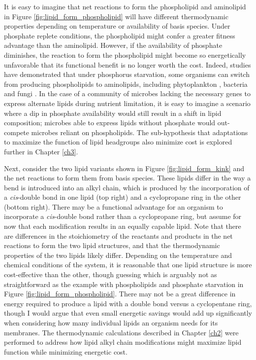It is easy to imagine that net reactions to form the phospholipid and aminolipid in Figure \ref{fig:lipid_form_phospholipid} will have different thermodynamic properties depending on temperature or availability of basis species. Under phosphate replete conditions, the phospholipid might confer a greater fitness advantage than the aminolipid. However, if the availability of phosphate diminishes, the reaction to form the phospholipid might become so energetically unfavorable that its functional benefit is no longer worth the cost. Indeed, studies have demonstrated that under phosphorus starvation, some organisms can switch from producing phospholipids to aminolipids, including phytoplankton \citep{van2009phytoplankton, martin2011phosphorus}, bacteria \citep{minnikin1974replacement, benning1995accumulation} and fungi \citep{riekhof2014phosphate}. In the case of a community of microbes lacking the necessary genes to express alternate lipids during nutrient limitation, it is easy to imagine a scenario where a dip in phosphate availability would still result in a shift in lipid composition; microbes able to express lipids without phosphate would out-compete microbes reliant on phospholipids. The sub-hypothesis that adaptations to maximize the function of lipid headgroups also minimize cost is explored further in Chapter \ref{ch3}.

Next, consider the two lipid variants shown in Figure \ref{fig:lipid_form_kink} and the net reactions to form them from basis species. These lipids differ in the way a bend is introduced into an alkyl chain, which is produced by the incorporation of a \textit{cis}-double bond in one lipid (top right) and a cyclopropane ring in the other (bottom right). There may be a functional advantage for an organism to incorporate a \textit{cis}-double bond rather than a cyclopropane ring, but assume for now that each modification results in an equally capable lipid. Note that there are differences in the stoichiometry of the reactants and products in the net reactions to form the two lipid structures, and that the thermodynamic properties of the two lipids likely differ. Depending on the temperature and chemical conditions of the system, it is reasonable that one lipid structure is more cost-effective than the other, though guessing which is arguably not as straightforward as the example with phospholipids and phosphate starvation in Figure \ref{fig:lipid_form_phospholipid}. There may not be a great difference in energy required to produce a lipid with a double bond versus a cyclopentane ring, though I would argue that even small energetic savings would add up significantly when considering how many individual lipids an organism needs for its membranes. The thermodynamic calculations described in Chapter \ref{ch2} were performed to address how lipid alkyl chain modifications might maximize lipid function while minimizing energetic cost.


